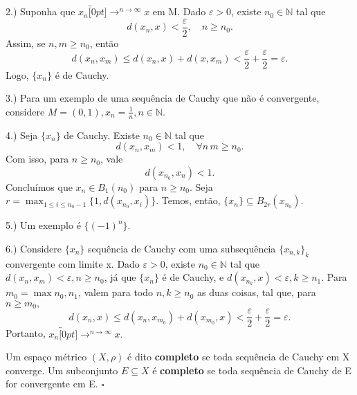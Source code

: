 \documentclass[metric_notes.tex]{subfiles}
\begin{document}
\begin{proof*}
	2.) Suponha que \(x_{n}\overbracket[0pt]{\longrightarrow}^{n\to \infty}x\) em M. Dado \(\varepsilon > 0\), existe \(n_{0}\in \mathbb{N}\) tal que
	\[
		d(x_{n}, x) < \frac{\varepsilon }{2},\quad n\geq n_{0}.
	\]
	Assim, se \(n, m\geq n_{0}\), então
	\[
		d(x_{n}, x_{m})\leq d(x_{n}, x) + d(x, x_{m}) < \frac{\varepsilon }{2}+\frac{\varepsilon }{2}=\varepsilon .
	\]
	Logo, \(\{x_{n}\}\) é de Cauchy.

	3.) Para um exemplo de uma sequência de Cauchy que não é convergente, considere \(M=(0, 1), x_{n}=\frac{1}{n},n\in \mathbb{N}\).

	4.) Seja \(\{x_{n}\}\) de Cauchy. Existe \(n_{0}\in \mathbb{N}\) tal que
	\[
		d(x_{n}, x_{m}) < 1,\quad \forall n\, m\geq n_{0}.
	\]
	Com isso, para \(n\geq n_{0}\), vale
	\[
		d(x_{n_{0}}, x_{n}) < 1.
	\]
	Concluímos que \(x_{n}\in B_{1}(n_{0})\) para \(n\geq n_{0}\). Seja \(r = \max_{1\leq i\leq n_{0}-1}\{1, d(x_{n_{0}}, x_{i})\}\). Temos, então,
	\(\{x_{n}\}\subseteq{B_{2r}(x_{n_{0}})}\).

	5.) Um exemplo é \(\{(-1)^{n}\}.\)

	6.) Considere \(\{x_{n}\}\) sequência de Cauchy com uma subsequência \(\{x_{n, k}\}_{k}\) convergente com limite x.
	Dado \(\varepsilon >0\), existe \(n_{0}\in \mathbb{N}\) tal que \(d(x_{n}, x_{m}) < \varepsilon , n\geq n_{0}\), já que \(\{x_{n}\}\) é de Cauchy,
	e \(d(x_{n_{k}}, x) < \varepsilon , k\geq n_{1}.\) Para \(m_{0}=\max{n_{0}, n_{1}}\), valem para
	todo \(n, k\geq n_{0}\) as duas coisas, tal que, para \(n\geq m_{0},\)
	\[
		d(x_{n}, x)\leq d(x_{n}, x_{m_{0}}) + d(x_{m_{0}}, x) < \frac{\varepsilon }{2} + \frac{\varepsilon }{2} = \varepsilon .
	\]
	Portanto, \(x_{n}\overbracket[0pt]{\longrightarrow}^{n\to \infty}x.\)
	\qedsymbol
\end{proof*}
\begin{def*}
	Um espaço métrico \((X, \rho )\) é dito \textbf{completo} se toda sequência de Cauchy em X converge. Um subconjunto \(E\subseteq{X}\) é \textbf{completo} se toda sequência de Cauchy de E for convergente em E. \(\square\)
\end{def*}
\end{document}
